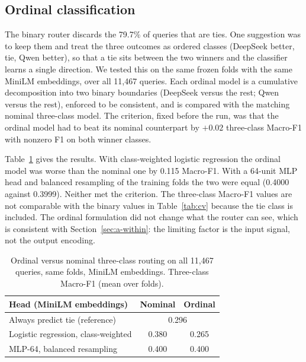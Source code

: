 \documentclass[lettersize,journal]{IEEEtran}
\begin{document}
\subsection{Ordinal classification}
\label{sec:a-ordinal}
The binary router discards the 79.7\% of queries that are ties. One suggestion was to keep them and treat the three outcomes as ordered classes (DeepSeek better, tie, Qwen better), so that a tie sits between the two winners and the classifier learns a single direction. We tested this on the same frozen folds with the same MiniLM embeddings, over all 11,467 queries. Each ordinal model is a cumulative decomposition into two binary boundaries (DeepSeek versus the rest; Qwen versus the rest), enforced to be consistent, and is compared with the matching nominal three-class model. The criterion, fixed before the run, was that the ordinal model had to beat its nominal counterpart by $+0.02$ three-class Macro-F1 with nonzero F1 on both winner classes.

Table~\ref{tab:ordinal} gives the results. With class-weighted logistic regression the ordinal model was worse than the nominal one by 0.115 Macro-F1. With a 64-unit MLP head and balanced resampling of the training folds the two were equal (0.4000 against 0.3999). Neither met the criterion. The three-class Macro-F1 values are not comparable with the binary values in Table~\ref{tab:cv} because the tie class is included. The ordinal formulation did not change what the router can see, which is consistent with Section~\ref{sec:a-within}: the limiting factor is the input signal, not the output encoding.

\begin{table}[t]
\centering
\caption{Ordinal versus nominal three-class routing on all 11,467 queries, same folds, MiniLM embeddings. Three-class Macro-F1 (mean over folds).}
\label{tab:ordinal}
\footnotesize
\setlength{\tabcolsep}{4pt}
\begin{tabular}{@{}lcc@{}}
\toprule
Head (MiniLM embeddings) & Nominal & Ordinal \\
\midrule
Always predict tie (reference) & \multicolumn{2}{c}{0.296} \\
Logistic regression, class-weighted & 0.380 & 0.265 \\
MLP-64, balanced resampling & 0.400 & 0.400 \\
\bottomrule
\end{tabular}
\end{table}
\end{document}
